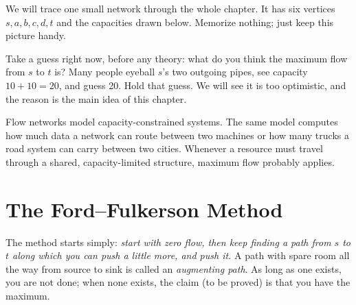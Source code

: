 We will trace one small network through the whole chapter. It has six vertices
$s, a, b, c, d, t$ and the capacities drawn below. Memorize nothing; just keep
this picture handy.

\begin{center}
\end{center}

Take a guess right now, before any theory: what do you think the maximum flow
from $s$ to $t$ is? Many people eyeball $s$'s two outgoing pipes, see capacity
$10 + 10 = 20$, and guess 20. Hold that guess. We will see it is too
optimistic, and the reason is the main idea of this chapter.

\begin{aestheticbox}
Flow networks model capacity-constrained systems. The same
model computes how much data a network can route between two machines or how
many trucks a road system can carry between two cities. Whenever a resource
must travel through a shared, capacity-limited structure, maximum flow
probably applies.
\end{aestheticbox}

\section{The Ford--Fulkerson Method}
\label{ch26:ff}

The method starts simply: \emph{start
with zero flow, then keep finding a path from $s$ to $t$ along which you can
push a little more, and push it.} A path with spare room all the way from
source to sink is called an \emph{augmenting path}. As long as one exists, you
are not done; when none exists, the claim (to be proved) is that you have the
maximum.

